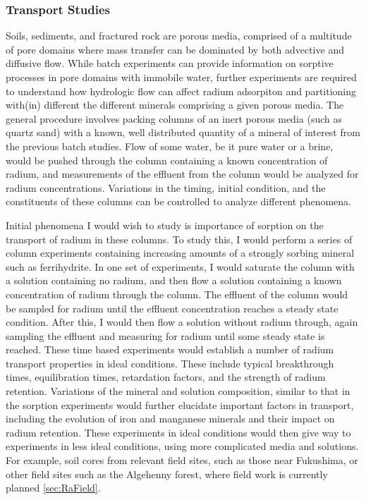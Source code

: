 \documentclass[twoside,12pt,titlepage]{article}
\begin{document}
\subsubsection{Transport Studies}
\label{sec:RaTransport}
Soils, sediments, and fractured rock are porous media, comprised of a multitude of pore domains where mass transfer can be dominated by both advective and diffusive flow. While batch experiments can provide information on sorptive processes in pore domains with immobile water, further experiments are required to understand how hydrologic flow can affect radium adsorpiton and partitioning with(in) different the different minerals comprising a given porous media. The general procedure involves packing columns of an inert porous media (such as quartz sand) with a known, well distributed quantity of a mineral of interest from the previous batch studies. Flow of some water, be it pure water or a brine, would be pushed through the column containing a known concentration of radium, and measurements of the effluent from the column would be analyzed for radium concentrations. Variations in the timing, initial condition, and the constituents of these columns can be controlled to analyze different phenomena.
\par Initial phenomena I would wish to study is importance of sorption on the transport of radium in these columns. To study this, I would perform a series of column experiments containing increasing amounts of a strongly sorbing mineral such as ferrihydrite. In one set of experiments, I would saturate the column with a solution containing no radium, and then flow a solution containing a known concentration of radium through the column. The effluent of the column would be sampled for radium until the effluent concentration reaches a steady state condition. After this, I would then flow a solution without radium through, again sampling the effluent and measuring for radium until some steady state is reached. These time based experiments would establish a number of radium transport properties in ideal conditions. These include typical breakthrough times, equilibration times, retardation factors, and the strength of radium retention. Variations of the mineral and solution composition, similar to that in the sorption experiments would further elucidate important factors in transport, including the evolution of iron and manganese minerals and their impact on radium retention. These experiments in ideal conditions would then give way to experiments in less ideal conditions, using more complicated media and solutions. For example, soil cores from relevant field sites, such as those near Fukushima, or other field sites such as the Algehenny forest, where field work is currently planned \ref{sec:RaField}.
\end{document}
